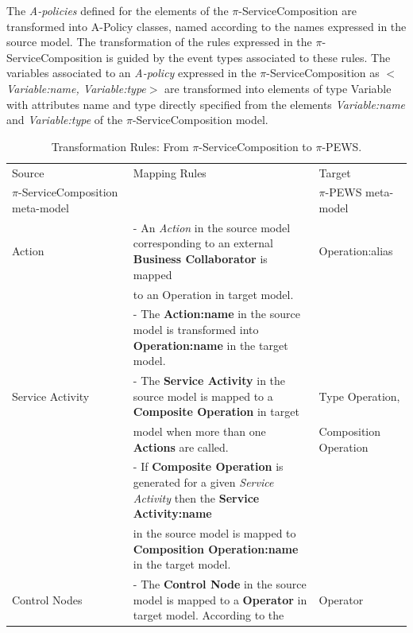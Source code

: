 The {\em A-policies} defined for the elements of the $\pi$-ServiceComposition are
transformed into {\sc A-Policy} classes, named according to the names expressed
in the source model. The transformation of the rules expressed in the
$\pi$-ServiceComposition is guided by the event types associated to these rules.
The variables associated to an {\em A-policy} expressed in the
$\pi$-ServiceComposition as {\sc\em $<$Variable:name, Variable:type$>$} are
transformed into elements of type {\sc Variable} with attributes {\sc name} and
{\sc type} directly specified from the elements {\sc\em  Variable:name} and
{\sc\em Variable:type} of the $\pi$-ServiceComposition model.


\begin{table}[ht!]
\tiny
\renewcommand{\arraystretch}{1.3}
\caption{Transformation Rules: From $\pi$-ServiceComposition to $\pi$-PEWS.}
\label{tab:transformationServiceCompositionToPEWS}
\centering
\begin{tabular}{l|l|l}
    \hline
    Source  &  Mapping Rules & Target\\
    $\pi$-ServiceComposition meta-model  &   & $\pi$-PEWS meta-model\\
    \hline
    \hline

    Action   &  - An \textit{Action} in the source model corresponding to an
    external \textbf{Business Collaborator} is mapped  & Operation:alias\\
       &   to an Operation in target model.   & \\
       &   - The \textbf{Action:name} in the source model is transformed into
       \textbf{Operation:name} in the target model.  & \\
    \hline

    Service Activity    & - The \textbf{Service Activity} in the source model is
    mapped to a \textbf{Composite Operation} in target  & Type Operation,\\
        &  model when more than one \textbf{Actions} are called.   &
        Composition Operation\\

        & - If \textbf{Composite Operation} is generated for a given
        \textit{Service Activity} then the \textbf{Service Activity:name} & \\
        & in the source model is mapped to
        \textbf{Composition Operation:name} in the target model. &\\
    \hline

    Control Nodes   &  - The \textbf{Control Node} in the source model is mapped
    to a \textbf{Operator} in target model. According to the & Operator\\


\end{tabular}
\end{table}
